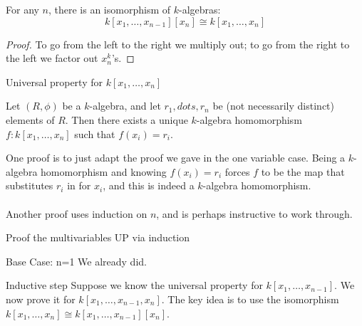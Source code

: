 \documentclass{beamer}
\begin{document}
\begin{frame}

\begin{lemma} For any $n$, there is an isomorphism of $k$-algebras:
$$k[x_1,\dots,x_{n-1}][x_n]\cong k[x_1,\dots, x_n]$$
\end{lemma}
\begin{proof}
To go from the left to the right we multiply out; to go from the right to the left we factor out $x_n^k$'s.
\end{proof}

\end{frame}





\begin{frame}{Universal property for $k[x_1,\dots, x_n]$}

\begin{lemma} Let $(R,\phi)$ be a $k$-algebra, and let $r_1,dots, r_n$ be (not necessarily distinct) elements of $R$.  Then there exists a unique $k$-algebra homomorphism $f:k[x_1,\dots, x_n]$ such that $f(x_i)=r_i$.
\end{lemma}

One proof is to just adapt the proof we gave in the one variable case.  Being a $k$-algebra homomorphism and knowing $f(x_i)=r_i$ forces $f$ to be the map that substitutes $r_i$ in for $x_i$, and this is indeed a $k$-algebra homomorphism. 
\\~\\ 

Another proof uses induction on $n$, and is perhaps instructive to work through.

\end{frame}

\begin{frame}{Proof the multivariables UP via induction}

\begin{block}{Base Case: n=1}
We already did.
\end{block}

\begin{block}{Inductive step}
Suppose we know the universal property for $k[x_1,\dots, x_{n-1}]$.  We now prove it for $k[x_1,\dots, x_{n-1},x_n]$.  The key idea is to use the isomorphism $k[x_1,\dots, x_n]\cong k[x_1,\dots, x_{n-1}][x_n]$.

\end{block}
\end{frame}
\end{document}
